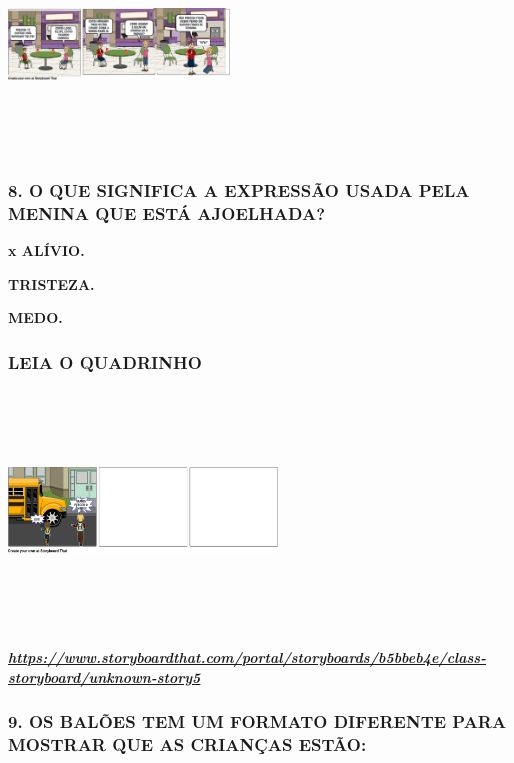 \includegraphics[width=2.31319in,height=2.23333in]{media/image175.png}

\subsubsection{8. O QUE SIGNIFICA A EXPRESSÃO USADA PELA MENINA QUE ESTÁ
AJOELHADA?}\label{o-que-significa-a-expressuxe3o-usada-pela-menina-que-estuxe1-ajoelhada}

\textbf{x ALÍVIO.}

\textbf{TRISTEZA.}

\textbf{MEDO. }

\subsubsection{LEIA O QUADRINHO}\label{leia-o-quadrinho}

\includegraphics[width=2.81319in,height=2.49306in]{media/image176.png}

\href{https://www.storyboardthat.com/portal/storyboards/b5bbeb4e/class-storyboard/unknown-story5}{\textbf{\emph{https://www.storyboardthat.com/portal/storyboards/b5bbeb4e/class-storyboard/unknown-story5}}}

\subsubsection{9. OS BALÕES TEM UM FORMATO DIFERENTE PARA MOSTRAR QUE AS
CRIANÇAS
ESTÃO:}\label{os-baluxf5es-tem-um-formato-diferente-para-mostrar-que-as-crianuxe7as-estuxe3o}

